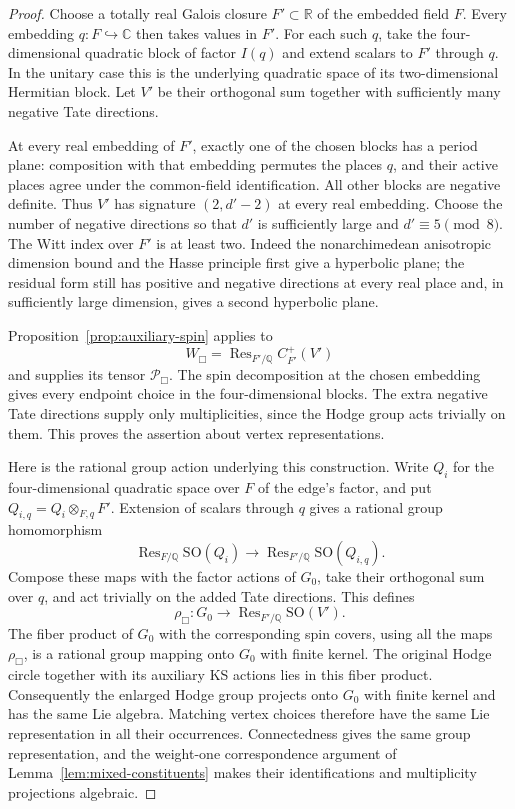 \documentclass[11pt]{article}
\numberwithin{equation}{section}
\theoremstyle{definition}
\theoremstyle{remark}
\begin{document}
\begin{proof}
Choose a totally real Galois closure $F'\subset\mathbb R$ of the embedded
field $F$.  Every embedding $q:F\hookrightarrow\mathbb C$ then takes values
in $F'$.  For each such $q$, take the four-dimensional quadratic block
of factor $I(q)$ and extend scalars to $F'$ through $q$.
In the unitary case this is the underlying
quadratic space of its two-dimensional Hermitian block.  Let $V'$ be
their orthogonal sum together with sufficiently many negative Tate
directions.

At every real embedding of $F'$, exactly one of the chosen blocks
has a period plane: composition with that embedding permutes the
places $q$, and their active places agree under the common-field
identification.  All other blocks are negative definite.  Thus $V'$
has signature $(2,d'-2)$ at every real embedding.  Choose the number
of negative directions so that $d'$ is sufficiently large and
$d'\equiv5\pmod8$.  The Witt index over $F'$ is at least two.
Indeed the nonarchimedean anisotropic dimension bound and the
Hasse principle first give a hyperbolic plane; the residual form
still has positive and negative directions at every real place and,
in sufficiently large dimension, gives a second hyperbolic plane.

Proposition~\ref{prop:auxiliary-spin} applies to
\[
 W_{\Box}=\operatorname{Res}_{F'/\mathbb Q}C^+_{F'}(V')
\]
and supplies its tensor $\mathcal P_{\Box}$.  The spin decomposition
at the chosen embedding gives every endpoint choice in the
four-dimensional blocks.  The extra negative Tate directions supply
only multiplicities, since the Hodge group acts trivially on them.
This proves the assertion about vertex representations.

Here is the rational group action underlying this construction.
Write $Q_i$ for the four-dimensional quadratic space over $F$ of
the edge's factor, and put $Q_{i,q}=Q_i\otimes_{F,q}F'$.  Extension
of scalars through $q$ gives a rational group homomorphism
\[
 \operatorname{Res}_{F/\mathbb Q}\mathrm{SO}(Q_i)
 \longrightarrow
 \operatorname{Res}_{F'/\mathbb Q}\mathrm{SO}(Q_{i,q}).
\]
Compose these maps with the factor actions of $G_0$, take their
orthogonal sum over $q$, and act trivially on the added Tate
directions.  This defines
\[
 \rho_{\Box}:G_0\longrightarrow
       \operatorname{Res}_{F'/\mathbb Q}\mathrm{SO}(V').
\]
The fiber product of $G_0$ with the corresponding spin covers,
using all the maps $\rho_{\Box}$, is a rational group mapping
onto $G_0$ with finite kernel.  The original Hodge circle together
with its auxiliary KS actions lies in this fiber product.
Consequently the enlarged Hodge group projects onto $G_0$ with
finite kernel and has the same Lie algebra.  Matching vertex
choices therefore have the same Lie representation in all their
occurrences.  Connectedness gives the same group representation,
and the weight-one correspondence argument of
Lemma~\ref{lem:mixed-constituents} makes their identifications and
multiplicity projections algebraic.
\end{proof}
\end{document}
